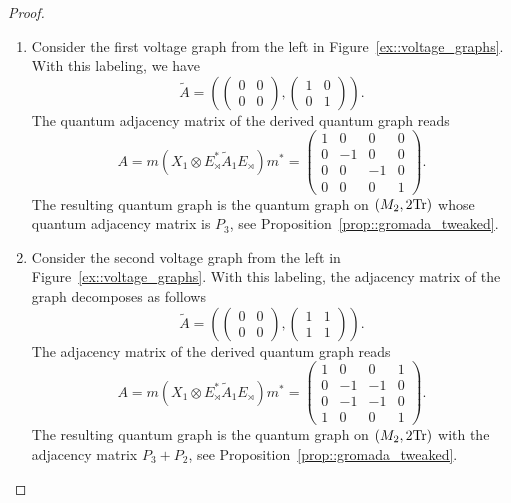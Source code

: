 \documentclass{amsart}
\theoremstyle{definition}
\theoremstyle{definition}
\begin{document}
\begin{proof}
\begin{enumerate} 
\item Consider the first voltage graph from the left in Figure~\ref{ex::voltage_graphs}. With this labeling, we have 
\[
\tilde{A}=\left(\begin{pmatrix}0 & 0\\ 0 & 0\end{pmatrix},\begin{pmatrix}1 & 0\\ 0 & 1\end{pmatrix}\right).
\]
The quantum adjacency matrix of the derived quantum graph reads
\[
A=m(X_1\otimes E^*_\rtimes \tilde{A}_1E_\rtimes)m^*=\begin{pmatrix}1 & 0 & 0 & 0\\ 0 & -1 & 0 & 0\\ 0 & 0 & -1 & 0\\ 0 & 0 & 0 & 1\end{pmatrix}.
\]
The resulting quantum graph is the quantum graph on $(M_2,2{\rm Tr})$ whose quantum adjacency matrix is $P_3$, see Proposition~\ref{prop::gromada_tweaked}.

\item Consider the second voltage graph from the left in Figure~\ref{ex::voltage_graphs}. With this labeling, the adjacency matrix of the graph decomposes as follows
\[
\tilde{A}=\left(\begin{pmatrix}0 & 0\\ 0 & 0\end{pmatrix},\begin{pmatrix}1 & 1\\ 1 & 1\end{pmatrix}\right).
\]
The adjacency matrix of the derived quantum graph reads
\[
A=m(X_1\otimes E^*_\rtimes \tilde{A}_1E_\rtimes)m^*=\begin{pmatrix}1 & 0 & 0 & 1\\ 0 & -1 & -1 & 0\\ 0 & -1 & -1 & 0\\ 1 & 0 & 0 & 1\end{pmatrix}.
\]
The resulting quantum graph is the quantum graph on $(M_2, 2{\rm Tr})$ with the adjacency matrix $P_3+P_2$, see Proposition~\ref{prop::gromada_tweaked}. 


\end{enumerate}
\end{proof}
\end{document}
